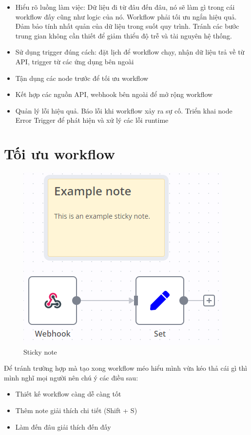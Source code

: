 \begin{itemize}
    \item Hiểu rõ luồng làm việc: Dữ liệu đi từ đâu đến đâu, nó sẽ làm gì trong cái workflow đấy cũng như logic của nó. Workflow phải tối ưu ngắn hiệu quả. Đảm bảo tính nhất quản của dữ liệu trong suốt quy trình. Tránh các bước trung gian không cần thiết để giảm thiểu độ trễ và tài nguyên hệ thống. 
    \item Sử dụng trigger đúng cách: đặt lịch để workflow chạy, nhận dữ liệu trả về từ API, trigger từ các ứng dụng bên ngoài 
    \item Tận dụng các node trước để tối ưu workflow
    \item Kết hợp các nguồn API, webhook bên ngoài để mở rộng workflow 
    \item Quản lý lỗi hiệu quả. Báo lỗi khi workflow xảy ra sự cố. Triển khai node Error Trigger để phát hiện và xử lý các lỗi runtime
\end{itemize}

\section{Tối ưu workflow}
\begin{figure}[htbp]
    \centering
    \includegraphics[width=0.6\linewidth]{Chap1-7/sticky-note.png}
    \caption{Sticky note}
\end{figure}

Để tránh trường hợp mà tạo xong workflow méo hiểu mình vừa kéo thả cái gì thì mình nghĩ mọi người nên chú ý các điều sau:
\begin{itemize}
    \item Thiết kế workflow càng dễ càng tốt
    \item Thêm note giải thích chi tiết (Shift + S)
    \item Làm đến đâu giải thích đến đấy
\end{itemize}


